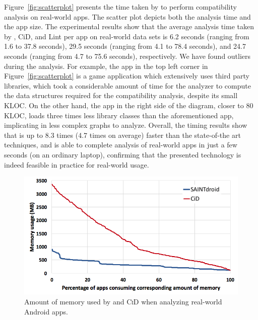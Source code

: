 Figure~\ref{fig:scatterplot} presents the time taken by \@approach 
to perform compatibility analysis on real-world apps.
The scatter plot depicts both the analysis time and the app size.  
The experimental results show that the average 
analysis time taken by \@approach, {\sc CiD}, and {\sc Lint} per app on
real-world data sets is 6.2 seconds (ranging from 1.6
to 37.8 seconds), 29.5 seconds (ranging from 4.1 to
78.4 seconds), and 24.7 seconds (ranging from 4.7 to
75.6 seconds), respectively. We have found outliers during the analysis. For example, the app in the top left corner in Figure~\ref{fig:scatterplot} is a game application which extensively uses third party libraries, which took a considerable amount of time for the analyzer to compute the data structures required for the compatibility analysis, despite its small KLOC. On the other hand, the app in the right side of the diagram, closer to 80 KLOC, loads three times less library classes than the aforementioned app, implicating in less complex graphs to analyze.  
Overall, the timing results show that \@approach  is up to 8.3 times (4.7 times on average) faster than the state-of-the art techniques, and is able to complete analysis of real-world apps in just a few seconds (on an ordinary laptop), confirming that the presented technology is indeed feasible in practice for real-world usage.



\begin{figure}[b!]
	\centering
	    \vspace{-0.5cm}
	\includegraphics[width=0.77\linewidth]{images/memory_gd.png}
	\vspace{-0.4cm}
	\caption{Amount of memory used by \@approach and \textsc{CiD} when analyzing real-world Android apps.}
	\label{fig:memory_gd}
\end{figure}

